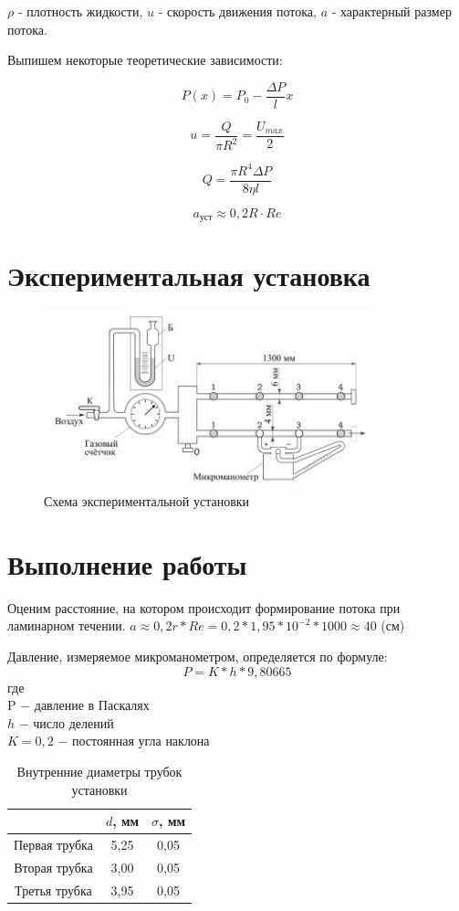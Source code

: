 \documentclass[12pt,a4paper]{article}
\begin{document}
$\rho$ - плотность жидкости, $u$ - скорость движения потока, $a$ - характерный размер потока.

Выпишем некоторые теоретические зависимости:

$$P(x) = P_{0} - \frac{\Delta P}{l}x$$

$$u = \frac{Q}{\pi R^{2}} = \frac{U_{max}}{2}$$

$$Q = \frac{\pi R^{4} \Delta P}{8\eta l}$$

$$a_{\text{уст}} \approx 0,2R\cdot Re$$
\newpage

\section{Экспериментальная установка}

\begin{figure}[h!]
	\begin{center}
		\includegraphics[width = 0.85\textwidth]{Scem_of_facility}
		\caption{Схема экспериментальной установки}
		\label{fig:facility}
	\end{center}
\end{figure}

\section{Выполнение работы}
\indent Оценим расстояние, на котором происходит формирование потока при ламинарном течении.
$a\approx0,2r*Re=0,2*1,95*10^{-2}*1000\approx 40$ (см)

Давление, измеряемое микроманометром, определяется по формуле:
$$P=K*h*9,80665$$
где \\
P $-$ давление в Паскалях \\
$h$ $-$ число делений \\
$K=0,2$ $-$ постоянная угла наклона \\

\begin{table}[h!]
\centering
\begin{tabular}{|c|c|c|}
\hline
              & $d$, мм & $\sigma$, мм \\ \hline
Первая трубка & 5,25    & 0,05         \\ \hline
Вторая трубка & 3,00    & 0,05         \\ \hline
Третья трубка & 3,95    & 0,05         \\ \hline
\end{tabular}
\caption{Внутренние диаметры трубок установки}
\label{tab:facilitys_tube_diam}
\end{table}
\end{document}
